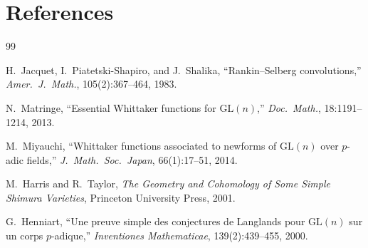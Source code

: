 \documentclass[12pt]{article}
\theoremstyle{definition}
\theoremstyle{remark}
\begin{document}
\section*{References}

\begin{thebibliography}{99}

H.~Jacquet, I.~Piatetski-Shapiro, and J.~Shalika,
``Rankin--Selberg convolutions,''
\emph{Amer.\ J.\ Math.}, 105(2):367--464, 1983.

N.~Matringe,
``Essential Whittaker functions for $\mathrm{GL}(n)$,''
\emph{Doc.\ Math.}, 18:1191--1214, 2013.

M.~Miyauchi,
``Whittaker functions associated to newforms of $\mathrm{GL}(n)$
over $p$-adic fields,''
\emph{J.\ Math.\ Soc.\ Japan}, 66(1):17--51, 2014.

M.~Harris and R.~Taylor,
\emph{The Geometry and Cohomology of Some Simple Shimura Varieties},
Princeton University Press, 2001.

G.~Henniart,
``Une preuve simple des conjectures de Langlands pour $\mathrm{GL}(n)$
sur un corps $p$-adique,''
\emph{Inventiones Mathematicae}, 139(2):439--455, 2000.

\end{thebibliography}
\end{document}
